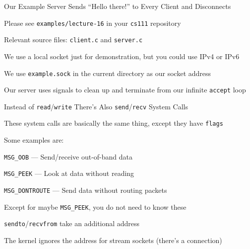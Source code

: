  \begin{frame}{Our Example Server Sends ``Hello there!'' to Every Client and
                Disconnects}

    Please see \texttt{examples/lecture-16} in your \texttt{cs111} repository

    \hspace{2em} Relevant source files: \texttt{client.c} and \texttt{server.c}

    \vspace{2em}

    We use a local socket just for demonstration, but you could use IPv4 or IPv6

    \hspace{2em} We use \texttt{example.sock} in the current directory as our
                 socket address

    \vspace{2em}

    Our server uses signals to clean up and terminate from our infinite
    \texttt{accept} loop
  \end{frame}

  \begin{frame}{Instead of \texttt{read}/\texttt{write} There's Also
                \texttt{send}/\texttt{recv} System Calls}

    These system calls are basically the same thing, except they have
    \texttt{flags}

    \vspace{2em}

    Some examples are:

    \hspace{2em} \texttt{MSG\_OOB} --- Send/receive out-of-band data

    \hspace{2em} \texttt{MSG\_PEEK} --- Look at data without reading

    \hspace{2em} \texttt{MSG\_DONTROUTE} --- Send data without routing packets

    \vspace{2em}

    Except for maybe \texttt{MSG\_PEEK}, you do not need to know these

    \vspace{2em}

    \texttt{sendto}/\texttt{recvfrom} take an additional address

    \hspace{2em} The kernel ignores the address for stream sockets (there's a
                 connection)
  \end{frame}

